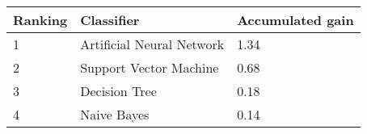 \begin{tabular}{|l|l|l|}
\hline
Ranking  & Classifier                & Accumulated gain  \\
\hline
1        & Artificial Neural Network & 1.34              \\
2        & Support Vector Machine    & 0.68              \\
3        & Decision Tree             & 0.18              \\
4        & Naive Bayes               & 0.14              \\
\hline
\end{tabular}
